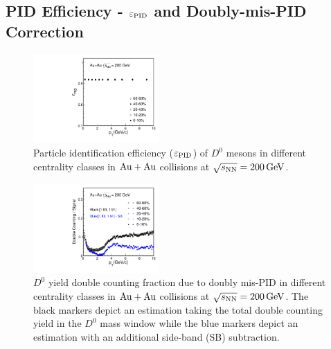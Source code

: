 \documentclass[%
 reprint,	
 amsmath,amssymb,
 aps,
 prc,
]{revtex4-1}
\begin{document}
\subsection{\label{sec:correction:PID}PID Efficiency - $\varepsilon_{\rm PID}$ and Doubly-mis-PID Correction}

\begin{figure}
\centering
\includegraphics[width=0.43\textwidth]{fig/Datad0Eff_pid_10.pdf}
\caption{Particle identification efficiency ($\varepsilon_{\rm PID}$) of $D^0$ mesons in different centrality classes in ${\rm{Au + Au}}$ collisions at ${\sqrt{s_{\rm NN}} = \rm{200\,GeV}}$.}
\label{fig:Datad0Eff_pid} 
\end{figure}

\begin{figure}
\centering
\includegraphics[width=0.43\textwidth]{fig/Double_counting.pdf}
\caption{$D^{0}$ yield double counting fraction due to doubly mis-PID in different centrality classes in ${\rm{Au + Au}}$ collisions at ${\sqrt{s_{\rm NN}} = \rm{200\,GeV}}$. The black markers depict an estimation taking the total double counting yield in the $D^0$ mass window while the blue markers depict an estimation with an additional side-band (SB) subtraction.}
\label{fig:Datad0Eff_doublecounting} 
\end{figure}
\end{document}
